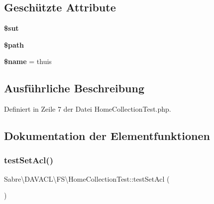 \subsection*{Geschützte Attribute}
\begin{DoxyCompactItemize}
\item 
\mbox{\label{class_sabre_1_1_d_a_v_a_c_l_1_1_f_s_1_1_home_collection_test_aec0de03c18c1a1528de35ae5fba1d0ea}} 
{\bfseries \$sut}
\item 
\mbox{\label{class_sabre_1_1_d_a_v_a_c_l_1_1_f_s_1_1_home_collection_test_a2d996dd24f403291d06e866cc241a479}} 
{\bfseries \$path}
\item 
\mbox{\label{class_sabre_1_1_d_a_v_a_c_l_1_1_f_s_1_1_home_collection_test_a468fa38a54e372dac48964b01aee33e7}} 
{\bfseries \$name} = \textquotesingle{}thuis\textquotesingle{}
\end{DoxyCompactItemize}


\subsection{Ausführliche Beschreibung}


Definiert in Zeile 7 der Datei Home\+Collection\+Test.\+php.



\subsection{Dokumentation der Elementfunktionen}
\mbox{\label{class_sabre_1_1_d_a_v_a_c_l_1_1_f_s_1_1_home_collection_test_a91daf2a2fa8fb87e1679bb9705988b98}} 
\subsubsection{\texorpdfstring{test\+Set\+Acl()}{testSetAcl()}}
{\footnotesize\ttfamily Sabre\textbackslash{}\+D\+A\+V\+A\+C\+L\textbackslash{}\+F\+S\textbackslash{}\+Home\+Collection\+Test\+::test\+Set\+Acl (\begin{DoxyParamCaption}{ }\end{DoxyParamCaption})}



